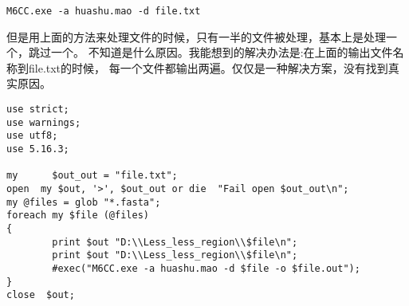 \documentclass[11pt]{ctexart}
\begin{document}
\begin{verbatim}
M6CC.exe -a huashu.mao -d file.txt
\end{verbatim}
但是用上面的方法来处理文件的时候，只有一半的文件被处理，基本上是处理一个，跳过一个。
不知道是什么原因。我能想到的解决办法是:在上面的输出文件名称到file.txt的时候，
每一个文件都输出两遍。仅仅是一种解决方案，没有找到真实原因。

\begin{verbatim}
use strict;
use warnings;
use utf8;
use 5.16.3;

my      $out_out = "file.txt";
open  my $out, '>', $out_out or die  "Fail open $out_out\n";
my @files = glob "*.fasta";
foreach my $file (@files)
{
        print $out "D:\\Less_less_region\\$file\n";
        print $out "D:\\Less_less_region\\$file\n";
        #exec("M6CC.exe -a huashu.mao -d $file -o $file.out");
}
close  $out;
\end{verbatim}
\end{document}
